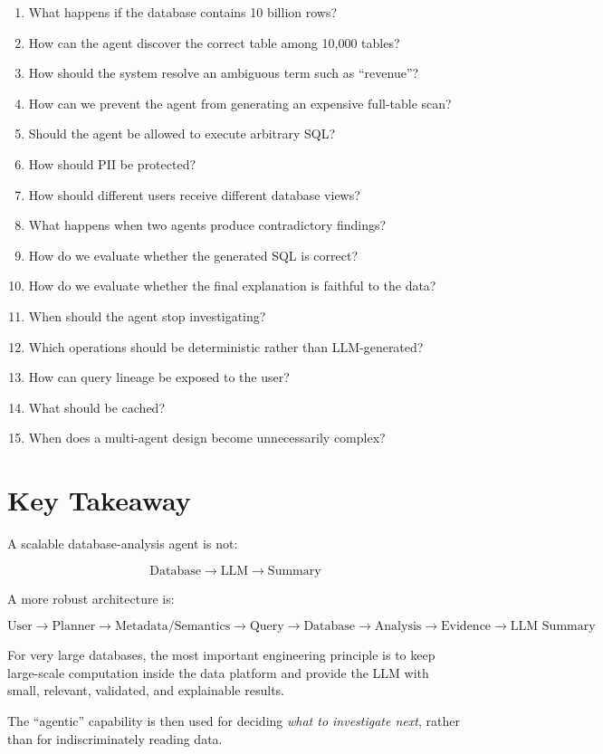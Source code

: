 \documentclass[11pt,a4paper]{article}
\begin{document}
\begin{enumerate}
    \item What happens if the database contains 10 billion rows?
    \item How can the agent discover the correct table among 10,000 tables?
    \item How should the system resolve an ambiguous term such as ``revenue''?
    \item How can we prevent the agent from generating an expensive full-table scan?
    \item Should the agent be allowed to execute arbitrary SQL?
    \item How should PII be protected?
    \item How should different users receive different database views?
    \item What happens when two agents produce contradictory findings?
    \item How do we evaluate whether the generated SQL is correct?
    \item How do we evaluate whether the final explanation is faithful to the data?
    \item When should the agent stop investigating?
    \item Which operations should be deterministic rather than LLM-generated?
    \item How can query lineage be exposed to the user?
    \item What should be cached?
    \item When does a multi-agent design become unnecessarily complex?
\end{enumerate}

\section{Key Takeaway}

A scalable database-analysis agent is not:

\[
\boxed{\text{Database} \rightarrow \text{LLM} \rightarrow \text{Summary}}
\]

A more robust architecture is:

\[
\boxed{
\text{User}
\rightarrow
\text{Planner}
\rightarrow
\text{Metadata/Semantics}
\rightarrow
\text{Query}
\rightarrow
\text{Database}
\rightarrow
\text{Analysis}
\rightarrow
\text{Evidence}
\rightarrow
\text{LLM Summary}
}
\]

For very large databases, the most important engineering principle is to keep
large-scale computation inside the data platform and provide the LLM with
small, relevant, validated, and explainable results.

The ``agentic'' capability is then used for deciding \emph{what to investigate
next}, rather than for indiscriminately reading data.
\end{document}
